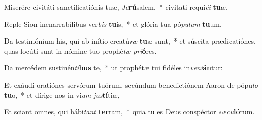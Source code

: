 \item Miserére civitáti sanctificatiónis tuæ, \textit{Je}\textbf{rú}salem,~* civitati requi\textit{é}\textit{i} \textbf{tu}æ.
\item Reple Sion inenarrabílibus ver\textit{bis} \textbf{tu}is,~* et glória tua pó\textit{pu}\textit{lum} \textbf{tu}um.
\item Da testimónium his, qui ab inítio creatú\textit{ræ} \textbf{tu}æ sunt,~* et súscita prædicatiónes, quas locúti sunt in nómine tuo prophé\textit{tæ} \textit{pri}\textbf{ó}res.
\item Da mercédem sustinén\textit{ti}\textbf{bus} te,~* ut prophétæ tui fidéles in\textit{ve}\textit{ni}\textbf{án}tur:
\item Et exáudi oratiónes servórum tuórum, secúndum benedictiónem Aaron de pópu\textit{lo} \textbf{tu}o,~* et dírige nos in vi\textit{am} \textit{jus}\textbf{tí}tiæ,
\item Et sciant omnes, qui hábi\textit{tant} \textbf{ter}ram,~* quia tu es Deus conspéctor \textit{sæ}\textit{cu}\textbf{ló}rum.

